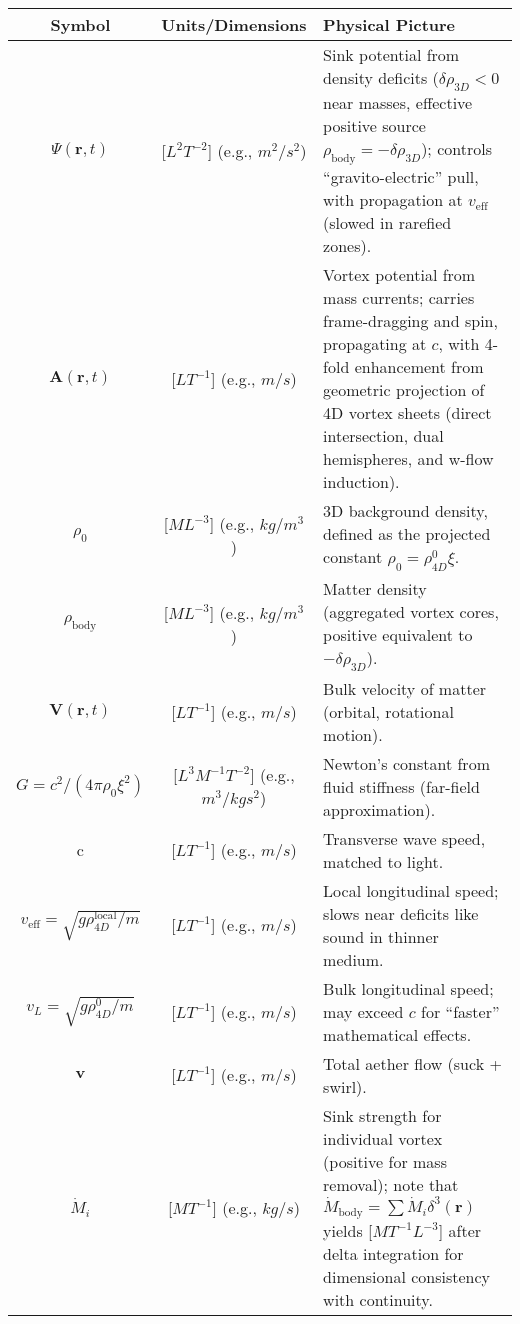 \documentclass{article}
\begin{document}
\begin{table}[h!]
\centering
\begin{tabularx}{\textwidth}{|c|c|Y|}
\hline
Symbol & Units/Dimensions & Physical Picture \\
\hline
$\Psi(\mathbf{r}, t)$ & [$L^2 T^{-2}$] (e.g., $m^2/s^2$) & Sink potential from density deficits ($\delta \rho_{3D} < 0$ near masses, effective positive source $\rho_{\text{body}} = -\delta \rho_{3D}$); controls ``gravito-electric'' pull, with propagation at $v_{\text{eff}}$ (slowed in rarefied zones). \\
\hline
$\mathbf{A}(\mathbf{r}, t)$ & [$L T^{-1}$] (e.g., $m/s$) & Vortex potential from mass currents; carries frame-dragging and spin, propagating at $c$, with 4-fold enhancement from geometric projection of 4D vortex sheets (direct intersection, dual hemispheres, and w-flow induction). \\
\hline
$\rho_0$ & [$M L^{-3}$] (e.g., $kg/m^3$) & 3D background density, defined as the projected constant $\rho_0 = \rho_{4D}^0 \xi$. \\
\hline
$\rho_{\text{body}}$ & [$M L^{-3}$] (e.g., $kg/m^3$) & Matter density (aggregated vortex cores, positive equivalent to $-\delta \rho_{3D}$). \\
\hline
$\mathbf{V}(\mathbf{r}, t)$ & [$L T^{-1}$] (e.g., $m/s$) & Bulk velocity of matter (orbital, rotational motion). \\
\hline
$G = c^2 / (4\pi \rho_0 \xi^2)$ & [$L^3 M^{-1} T^{-2}$] (e.g., $m^3/kg s^2$) & Newton's constant from fluid stiffness (far-field approximation). \\
\hline
c & [$L T^{-1}$] (e.g., $m/s$) & Transverse wave speed, matched to light. \\
\hline
$v_{\text{eff}} = \sqrt{g \rho_{4D}^{\text{local}} / m}$ & [$L T^{-1}$] (e.g., $m/s$) & Local longitudinal speed; slows near deficits like sound in thinner medium. \\
\hline
$v_L = \sqrt{g \rho_{4D}^0 / m}$ & [$L T^{-1}$] (e.g., $m/s$) & Bulk longitudinal speed; may exceed $c$ for ``faster'' mathematical effects. \\
\hline
$\mathbf{v}$ & [$L T^{-1}$] (e.g., $m/s$) & Total aether flow (suck + swirl). \\
\hline
$\dot{M}_i$ & [$M T^{-1}$] (e.g., $kg/s$) & Sink strength for individual vortex (positive for mass removal); note that $\dot{M}_{\text{body}} = \sum \dot{M}_i \delta^3(\mathbf{r})$ yields [$M T^{-1} L^{-3}$] after delta integration for dimensional consistency with continuity. \\

\end{tabularx}
\end{table}
\end{document}
